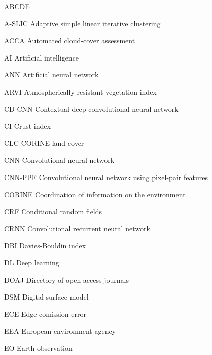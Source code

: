 
\begin{seznamzkratek}{ABCDE}

	      {A-SLIC}
	      {\qquad Adaptive simple linear iterative clustering}

	      {ACCA}
	      {\qquad Automated cloud-cover assessment}

	      {AI}
	      {\qquad Artificial intelligence}

	      {ANN}
	      {\qquad Artificial neural network}

	      {ARVI}
	      {\qquad Atmospherically resistant vegetation index}

	      {CD-CNN}
	      {\hspace{5.0mm} Contextual deep convolutional neural network}

	      {CI}
	      {\qquad Crust index}

	      {CLC}
	      {\qquad CORINE land cover}

	      {CNN}
	      {\qquad Convolutional neural network}

	      {CNN-PPF}
	      {\hspace{2.9mm} Convolutional neural network using pixel-pair features}

	      {CORINE}
	      {\hspace{5.0mm} Coordination of information on the environment}

	      {CRF}
	      {\qquad Conditional random fields}

	      {CRNN}
	      {\qquad Convolutional recurrent neural network}

	      {DBI}
	      {\qquad Davies-Bouldin index}

	      {DL}
	      {\qquad Deep learning}

	      {DOAJ}
	      {\qquad Directory of open access journals}

	      {DSM}
	      {\qquad Digital surface model}

	      {ECE}
	      {\qquad Edge comission error}

	      {EEA}
	      {\qquad European environment agency}

	      {EO}
	      {\qquad Earth observation}


\end{seznamzkratek}
